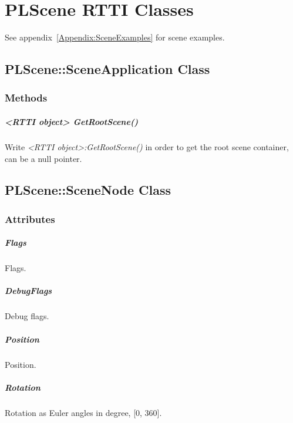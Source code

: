 \chapter{PLScene \ac{RTTI} Classes}
See appendix~\ref{Appendix:SceneExamples} for scene examples.




\section{PLScene::SceneApplication Class}


\subsection{Methods}

\paragraph{<RTTI object> GetRootScene()}
Write \emph{<RTTI object>:GetRootScene()} in order to get the root scene container, can be a null pointer.




\section{PLScene::SceneNode Class}


\subsection{Attributes}

\paragraph{Flags}
Flags.

\paragraph{DebugFlags}
Debug flags.

\paragraph{Position}
Position.

\paragraph{Rotation}
Rotation as Euler angles in degree, [0, 360].

